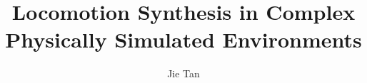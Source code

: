 \documentclass{gatech-thesis}
\title{Locomotion Synthesis in Complex Physically Simulated Environments}
\author{Jie Tan}
\begin{document}

%
\begin{preliminary}
\begin{acknowledgements}

\end{acknowledgements}
%
\contents
%
\begin{summary}

\end{summary}
\end{preliminary}
%







\begin{postliminary}
\end{postliminary}
\end{document}
